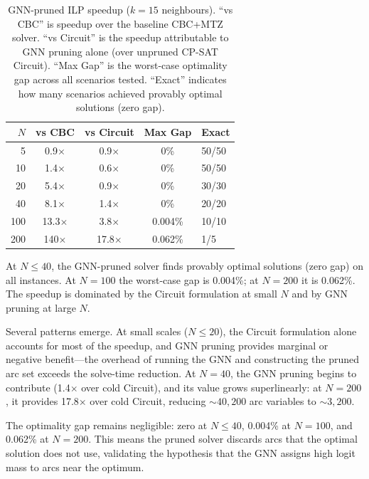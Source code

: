 \documentclass[conference]{IEEEtran}
\begin{document}
\begin{table}[htbp]
\caption{GNN-pruned ILP speedup ($k{=}15$ neighbours). ``vs CBC'' is speedup over the baseline CBC+MTZ solver. ``vs Circuit'' is the speedup attributable to GNN pruning alone (over unpruned CP-SAT Circuit). ``Max Gap'' is the worst-case optimality gap across all scenarios tested. ``Exact'' indicates how many scenarios achieved provably optimal solutions (zero gap).}
\label{tab:ilp_speedup}
\centering
\begin{tabular}{@{}rcccl@{}}
\toprule
$N$ & \textbf{vs CBC} & \textbf{vs Circuit} & \textbf{Max Gap} & \textbf{Exact} \\
\midrule
5   & 0.9$\times$   & 0.9$\times$  & 0\%     & 50/50 \\
10  & 1.4$\times$   & 0.6$\times$  & 0\%     & 50/50 \\
20  & 5.4$\times$   & 0.9$\times$  & 0\%     & 30/30 \\
40  & 8.1$\times$   & 1.4$\times$  & 0\%     & 20/20 \\
100 & 13.3$\times$  & 3.8$\times$  & 0.004\% & 10/10 \\
200 & 140$\times$   & 17.8$\times$ & 0.062\% & 1/5 \\
\bottomrule
\end{tabular}
\vspace{1mm}

\footnotesize At $N{\le}40$, the GNN-pruned solver finds provably optimal solutions (zero gap) on all instances. At $N{=}100$ the worst-case gap is 0.004\%; at $N{=}200$ it is 0.062\%. The speedup is dominated by the Circuit formulation at small $N$ and by GNN pruning at large $N$.
\end{table}

Several patterns emerge. At small scales ($N{\le}20$), the Circuit formulation alone accounts for most of the speedup, and GNN pruning provides marginal or negative benefit---the overhead of running the GNN and constructing the pruned arc set exceeds the solve-time reduction. At $N{=}40$, the GNN pruning begins to contribute (1.4$\times$ over cold Circuit), and its value grows superlinearly: at $N{=}200$, it provides 17.8$\times$ over cold Circuit, reducing ${\sim}40{,}200$ arc variables to ${\sim}3{,}200$.

The optimality gap remains negligible: zero at $N{\le}40$, 0.004\% at $N{=}100$, and 0.062\% at $N{=}200$. This means the pruned solver discards arcs that the optimal solution does not use, validating the hypothesis that the GNN assigns high logit mass to arcs near the optimum.
\end{document}
